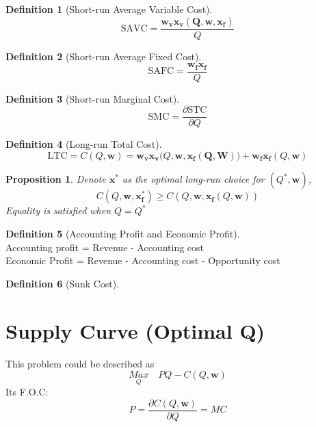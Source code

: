 \documentclass{book}
\theoremstyle{plain}
\newtheorem{prop}[thm]{Proposition}
\theoremstyle{definition}
\newtheorem{defn}{Definition}[section]
\theoremstyle{remark}
\begin{document}
\begin{defn}[Short-run Average Variable Cost]
\begin{equation}
	\text{SAVC} = \frac{\bm{w_v}\bm{x_v(Q,\bm{w},\bm{x_f})}}{Q}
\end{equation}
\end{defn}


\begin{defn}[Short-run Average Fixed Cost]
\begin{equation}
	\text{SAFC} = \frac{\bm{w_f}\bm{x_f}}{Q}
\end{equation}
\end{defn}

\begin{defn}[Short-run Marginal Cost]
\begin{equation}
	\text{SMC} = \frac{\partial \text{STC}}{\partial Q}
\end{equation}
\end{defn}

\begin{defn}[Long-run Total Cost]
\begin{equation}
	\text{LTC} = C(Q,\bm{w}) = \bm{w_v}\bm{x_v}(Q,\bm{w},\bm{x_f(Q,\bm{W}))} + \bm{w_f}\bm{x_f}(Q,\bm{w})
\end{equation}
\end{defn}

\begin{prop}
Denote $\bm{x^{*}}$ as the optimal long-run choice for $(Q^{*},\bm{w})$, 
\begin{equation}
	C(Q,\bm{w},\bm{x^{*}_f}) \geq C(Q,\bm{w},\bm{x_f}(Q,\bm{w}))
\end{equation}
Equality is satisfied when $Q = Q^{*}$
\end{prop}

\begin{defn}[Accounting Profit and Economic Profit]\quad\\
Accounting profit = Revenue - Accounting cost\\
Economic Profit = Revenue - Accounting cost - Opportunity cost
\end{defn}

\begin{defn}[Sunk Cost]
\end{defn}

\section{Supply Curve (Optimal Q)}
This problem could be described as
\begin{equation}
	\underset{Q}{Max} \quad PQ - C(Q,\bm{w})
\end{equation}
Its F.O.C:
\begin{equation}
	P = \frac{\partial C(Q,\bm{w})}{\partial Q} = MC
\end{equation}
\end{document}
